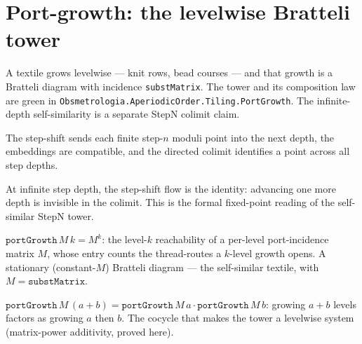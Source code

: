 \section{Port-growth: the levelwise Bratteli tower}

A textile grows levelwise --- knit rows, bead courses --- and that growth is a Bratteli diagram with
incidence \texttt{substMatrix}. The tower and its composition law are green in
\texttt{Obsmetrologia.AperiodicOrder.Tiling.PortGrowth}.  The infinite-depth
self-similarity is a separate StepN colimit claim.

\begin{theorem}\label{thm:stepn-shift-chain-colimit}\leanok{}
The step-shift sends each finite step-$n$ moduli point into the next depth,
the embeddings are compatible, and the directed colimit identifies a point
across all step depths.
\end{theorem}

\begin{theorem}\label{thm:stepn-colimit-rg-fixed-point}\leanok{}
At infinite step depth, the step-shift flow is the identity: advancing one
more depth is invisible in the colimit.  This is the formal fixed-point
reading of the self-similar StepN tower.
\end{theorem}

\begin{proposition}\label{thm:port-growth}\leanok{}
$\texttt{portGrowth}\,M\,k = M^k$: the level-$k$ reachability of a per-level port-incidence matrix
$M$, whose entry counts the thread-routes a $k$-level growth opens. A stationary (constant-$M$)
Bratteli diagram --- the self-similar textile, with $M = \texttt{substMatrix}$.
\end{proposition}

\begin{theorem}\label{thm:port-growth-telescopes}\leanok{}
$\texttt{portGrowth}\,M\,(a+b) = \texttt{portGrowth}\,M\,a \cdot \texttt{portGrowth}\,M\,b$: growing
$a+b$ levels factors as growing $a$ then $b$. The cocycle that makes the tower a levelwise system
(matrix-power additivity, proved here).
\end{theorem}

